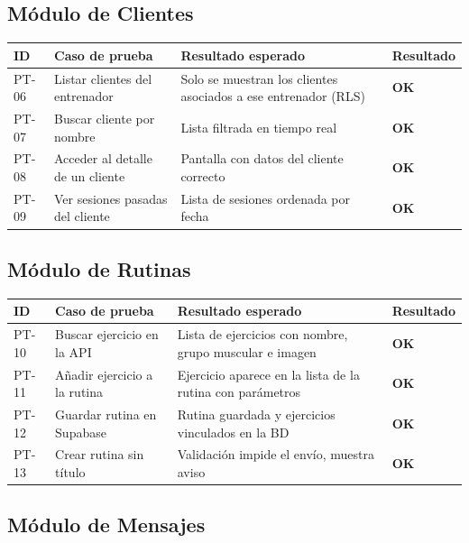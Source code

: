 \subsection{Módulo de Clientes}

\begin{longtable}{@{}p{1cm}p{5cm}p{5cm}p{2.5cm}@{}}
\toprule
\textbf{ID} & \textbf{Caso de prueba} & \textbf{Resultado esperado} & \textbf{Resultado} \\
\midrule
\endhead
PT-06 & Listar clientes del entrenador & Solo se muestran los clientes asociados a ese entrenador (RLS) & \textcolor{green!60!black}{\textbf{OK}} \\
PT-07 & Buscar cliente por nombre & Lista filtrada en tiempo real & \textcolor{green!60!black}{\textbf{OK}} \\
PT-08 & Acceder al detalle de un cliente & Pantalla con datos del cliente correcto & \textcolor{green!60!black}{\textbf{OK}} \\
PT-09 & Ver sesiones pasadas del cliente & Lista de sesiones ordenada por fecha & \textcolor{green!60!black}{\textbf{OK}} \\
\bottomrule
\end{longtable}

\subsection{Módulo de Rutinas}

\begin{longtable}{@{}p{1cm}p{5cm}p{5cm}p{2.5cm}@{}}
\toprule
\textbf{ID} & \textbf{Caso de prueba} & \textbf{Resultado esperado} & \textbf{Resultado} \\
\midrule
\endhead
PT-10 & Buscar ejercicio en la API & Lista de ejercicios con nombre, grupo muscular e imagen & \textcolor{green!60!black}{\textbf{OK}} \\
PT-11 & Añadir ejercicio a la rutina & Ejercicio aparece en la lista de la rutina con parámetros & \textcolor{green!60!black}{\textbf{OK}} \\
PT-12 & Guardar rutina en Supabase & Rutina guardada y ejercicios vinculados en la BD & \textcolor{green!60!black}{\textbf{OK}} \\
PT-13 & Crear rutina sin título & Validación impide el envío, muestra aviso & \textcolor{green!60!black}{\textbf{OK}} \\
\bottomrule
\end{longtable}

\subsection{Módulo de Mensajes}

